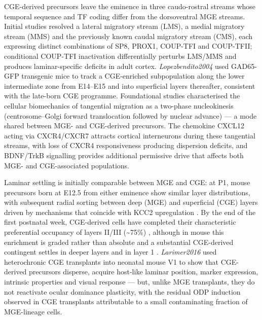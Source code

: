 \documentclass[11pt]{article}
\begin{document}
CGE-derived precursors leave the eminence in three caudo-rostral streams whose temporal sequence and TF coding differ from the dorsoventral MGE streams. Initial studies \citep{Touzot2016} resolved a lateral migratory stream (LMS), a medial migratory stream (MMS) and the previously known caudal migratory stream (CMS), each expressing distinct combinations of SP8, PROX1, COUP-TFI and COUP-TFII; conditional COUP-TFI inactivation differentially perturbs LMS/MMS and produces laminar-specific deficits in adult cortex. \textit{Lopezbendito2004} used GAD65-GFP transgenic mice to track a CGE-enriched subpopulation along the lower intermediate zone from E14--E15 and into superficial layers thereafter, consistent with the late-born CGE programme. Foundational studies \citep{Bellion2005} characterised the cellular biomechanics of tangential migration as a two-phase nucleokinesis (centrosome--Golgi forward translocation followed by nuclear advance) --- a mode shared between MGE- and CGE-derived precursors. The chemokine CXCL12 acting via CXCR4/CXCR7 attracts cortical interneurons during these tangential streams, with loss of CXCR4 responsiveness producing dispersion deficits, and BDNF/TrkB signalling provides additional permissive drive that affects both MGE- and CGE-associated populations.

Laminar settling is initially comparable between MGE and CGE: at P1, mouse precursors born at E12.5 from either eminence show similar layer distributions, with subsequent radial sorting between deep (MGE) and superficial (CGE) layers driven by mechanisms that coincide with KCC2 upregulation \citep{Miyoshi2011}. By the end of the first postnatal week, CGE-derived cells have completed their characteristic preferential occupancy of layers II/III ({\textasciitilde}75\%) \citep{Miyoshi2010}, although in mouse this enrichment is graded rather than absolute and a substantial CGE-derived contingent settles in deeper layers and in layer 1 \citep{Lee2010}. \textit{Larimer2016} used heterochronic CGE transplants into neonatal mouse V1 to show that CGE-derived precursors disperse, acquire host-like laminar position, marker expression, intrinsic properties and visual response --- but, unlike MGE transplants, they do not reactivate ocular dominance plasticity, with the residual ODP induction observed in CGE transplants attributable to a small contaminating fraction of MGE-lineage cells.
\end{document}
